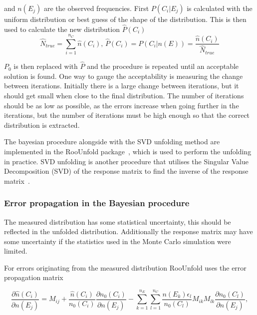 \noindent and $n\left(E_j\right)$ are the observed frequencies. First  $P\left(C_i |E_j\right)$ is calculated with the uniform distribution or best guess of the shape of the distribution. This is then used to calculate the new distribution $\hat P\left(C_i\right)$
\begin{equation}
\hat N_{true} = \sum_{i=1}^{n_C} \hat n\left(C_i\right),\,\hat P\left(C_i\right) = P\left(C_i | n\left(E\right)\right) = \frac{\hat n\left(C_i\right)}{\hat N_{true}}
\label{eq:unfolded}
\end{equation}

$P_0$ is then replaced with $\hat P$ and the procedure is repeated until an acceptable solution is found. One way to gauge the acceptability is measuring the change between iterations. Initially there is a large change between iterations, but it should get small when close to the final distribution. The number of iterations should be as low as possible, as the errors increase when going further in the iterations, but the number of iterations must be high enough so that the correct distribution is extracted. 

The bayesian procedure alongside with the SVD unfolding method are implemented in the RooUnfold package~\cite{roounfold}, which is used to perform the unfolding in practice. SVD unfolding is another procedure that utilises the Singular Value Decomposition (SVD) of the response matrix to find the inverse of the response matrix~\cite{Hocker:1995kb}.
 
 \subsubsection*{Error propagation in the Bayesian procedure }
 The measured distribution has some statistical uncertainty, this should be reflected in the unfolded distribution. Additionally the response matrix may have some uncertainty if the statistics used in the Monte Carlo simulation were limited. 
 
For errors originating from the measured distribution RooUnfold uses the error propagation matrix 

\begin{equation}
\frac{\partial \hat n\left(C_i\right)}{\partial n\left(E_j\right)} = M_{ij} + \frac{\hat n\left(C_i\right)}{n_0\left(C_i\right)}\frac{\partial n_0\left(C_i\right) }{\partial n\left(E_j\right) } - \sum_{k=1}^{n_E}\sum_{l=1}^{n_C} \frac{n\left(E_k\right) \epsilon_l}{n_0\left(C_l\right)} M_{ik} M_{lk} \frac{\partial n_0 \left(C_l\right)}{\partial n\left(E_j\right)},
\end{equation} 
 

